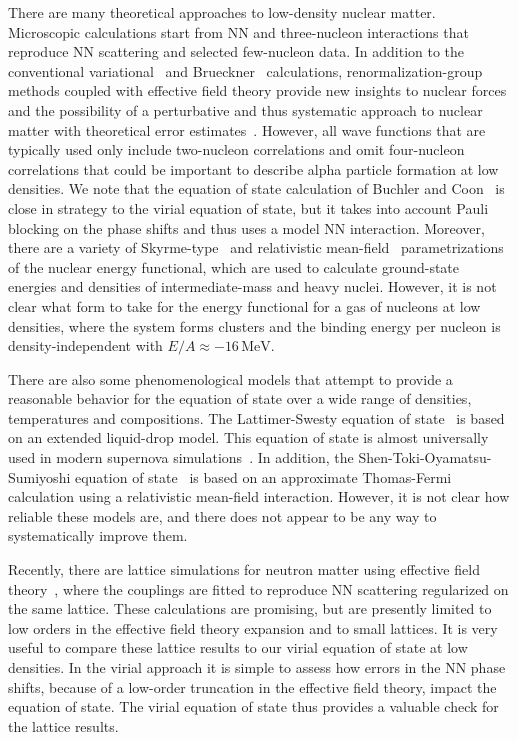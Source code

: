 \documentclass[aps,prc,twocolumn,showpacs,showkeys,amsmath,amssymb]{revtex4}
\newcommand{\mev}{\, \text{MeV}}
\begin{document}
There are many theoretical approaches to low-density nuclear matter.  
Microscopic calculations start from NN and three-nucleon interactions
that reproduce NN scattering and selected few-nucleon data.
In addition to the conventional variational~\cite{FP,APR} 
and Brueckner~\cite{Brueckner1,Brueckner2} calculations, 
renormalization-group
methods coupled with effective field theory provide new insights
to nuclear forces and the possibility of a perturbative and thus
systematic approach to nuclear matter
with theoretical error estimates~\cite{Vlowk1,Vlowk2}. However, 
all wave functions that are typically used only include two-nucleon 
correlations and omit four-nucleon correlations that could be 
important to describe alpha particle formation at low densities.  
We note that the equation of
state calculation of Buchler and Coon~\cite{BC} is close in strategy to 
the virial equation of state, but it takes into account Pauli blocking
on the phase shifts and thus uses a model NN interaction.
Moreover, there are a variety of Skyrme-type~\cite{skyrme1,skyrme2,skyrme3} 
and relativistic mean-field~\cite{RMF1,RMF2,RMF3} 
parametrizations of the nuclear energy functional,
which are used to calculate ground-state energies and densities of
intermediate-mass and heavy nuclei.  However, it is not clear what 
form to take for the energy functional for a gas of nucleons 
at low densities, where the system forms clusters and the binding energy 
per nucleon is density-independent with $E/A \approx -16 \mev$.

There are also some phenomenological models that attempt to provide 
a reasonable behavior for the equation of state over a wide range of 
densities, temperatures and compositions.  The Lattimer-Swesty
equation of state~\cite{LS} is based on an extended liquid-drop model.  
This equation of state is almost universally used in modern supernova 
simulations~\cite{snsim1,snsim2}. In addition, the 
Shen-Toki-Oyamatsu-Sumiyoshi equation of state~\cite{Shen} is based 
on an approximate Thomas-Fermi calculation using a relativistic 
mean-field interaction.  However, it is not clear how 
reliable these models are, and there does not appear to be any way 
to systematically improve them.  

Recently, there are lattice simulations for neutron matter 
using effective field theory~\cite{Dean}, where the couplings
are fitted to reproduce NN scattering regularized on the same lattice.  
These calculations are promising, but are presently limited to low orders 
in the effective field theory expansion and to small lattices.  It is 
very useful to compare these lattice results to our virial equation of 
state at low densities.  In the virial approach it is simple to assess
how errors in the NN phase shifts, because of a low-order truncation
in the effective field theory, impact the equation of state.  The virial
equation of state thus provides a valuable check for the lattice results.
\end{document}
